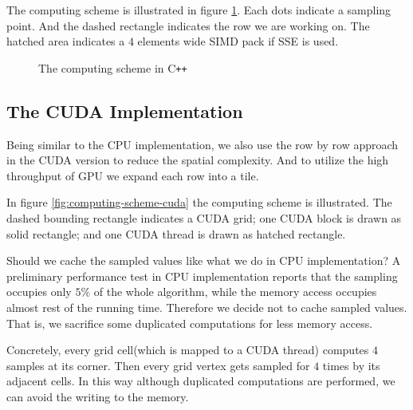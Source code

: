 \documentclass[a4paper,12pt]{article}
\begin{document}
The computing scheme is illustrated in figure \ref{fig:computing-scheme-cpp}.
Each dots indicate a sampling point.
And the dashed rectangle indicates the row we are working on.
The hatched area indicates a $4$ elements wide SIMD pack if SSE is used.

\begin{figure}[h]
\centering
{}
\caption{The computing scheme in C\texttt{++}}
\label{fig:computing-scheme-cpp}
\end{figure}

\subsection{The CUDA Implementation}

Being similar to the CPU implementation,
we also use the row by row approach in the CUDA version
to reduce the spatial complexity.
And to utilize the high throughput of GPU we expand each row into
a tile.

In figure \ref{fig:computing-scheme-cuda} the computing scheme is illustrated.
The dashed bounding rectangle indicates a CUDA grid;
one CUDA block is drawn as solid rectangle;
and one CUDA thread is drawn as hatched rectangle.

Should we cache the sampled values like what we do in CPU implementation?
A preliminary performance test in CPU implementation
reports that the sampling occupies only $5\%$ of the whole algorithm,
while the memory access occupies almost rest of the running time.
Therefore we decide not to cache sampled values.
That is, we sacrifice some duplicated computations for less memory access.

Concretely,
every grid cell(which is mapped to a CUDA thread)
computes $4$ samples at its corner.
Then every grid vertex gets sampled for $4$ times by its adjacent cells.
In this way although duplicated computations are performed,
we can avoid the writing to the memory.
\end{document}
